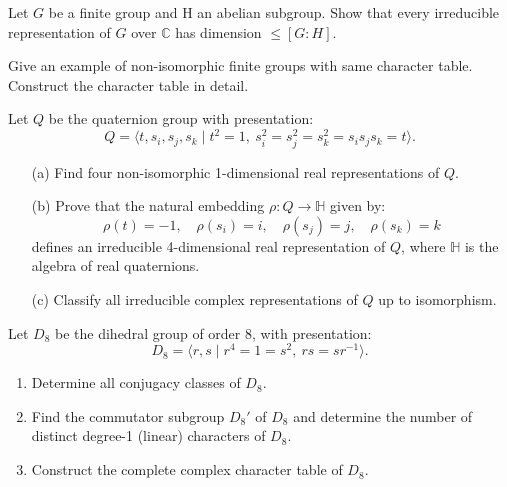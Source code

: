 \begin{prob}[S2017-Q6]
    Let $G$ be a finite group and H an abelian subgroup. Show that every
    irreducible representation of $G$ over $\mathbb{C}$ has dimension 
    $\leq[G : H]$.
\end{prob}

\begin{prob}[S2008-Q6]
    Give an example of non-isomorphic finite groups with same character
table. Construct the character table in detail.
\end{prob}

\begin{prob}[S2012-Q4]
    Let \( Q \) be the quaternion group with presentation:
\[
Q = \langle t, s_i, s_j, s_k \mid t^2 = 1,\ s_i^2 = s_j^2 = s_k^2 = s_i s_j s_k = t \rangle.
\]

\begin{enumerate}
    \item[(a)] Find four non-isomorphic 1-dimensional real representations of \( Q \).
    
    \item[(b)] Prove that the natural embedding \( \rho \colon Q \to \mathbb{H} \) given by:
    \[
    \rho(t) = -1, \quad \rho(s_i) = i, \quad \rho(s_j) = j, \quad \rho(s_k) = k
    \]
    defines an irreducible 4-dimensional real representation of \( Q \), where \( \mathbb{H} \) is the algebra of real quaternions.
    
    \item[(c)] Classify all irreducible complex representations of \( Q \) up to isomorphism.
\end{enumerate}
\end{prob}

\begin{prob}[F2004-Q6]
    Let \( D_8 \) be the dihedral group of order 8, with presentation:
    \[
    D_8 = \langle r, s \mid r^4 = 1 = s^2,\ rs = sr^{-1} \rangle.
    \]
    
    \begin{enumerate}
        \item Determine all conjugacy classes of \( D_8 \).
        
        \item Find the commutator subgroup \( D_8' \) of \( D_8 \) and determine the number of distinct degree-1 (linear) characters of \( D_8 \).
        
        \item Construct the complete complex character table of \( D_8 \).
    \end{enumerate}
\end{prob}

